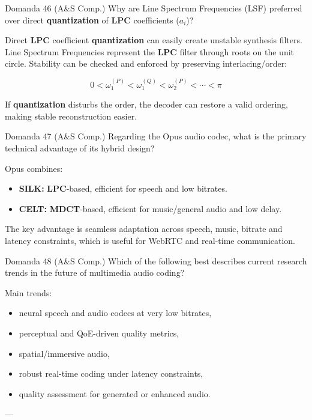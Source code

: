 \begin{questionbox}{Domanda 46}
(A\&S Comp.) Why are Line Spectrum Frequencies (LSF) preferred over direct \textbf{quantization} of \textbf{LPC} coefficients ($a_i$)?
\end{questionbox}


Direct \textbf{LPC} coefficient \textbf{quantization} can easily create unstable synthesis filters. Line Spectrum Frequencies represent the \textbf{LPC} filter through roots on the unit circle. Stability can be checked and enforced by preserving interlacing/order:


$$
0<\omega_1^{(P)}<\omega_1^{(Q)}<\omega_2^{(P)}<\cdots<\pi
$$


If \textbf{quantization} disturbs the order, the decoder can restore a valid ordering, making stable reconstruction easier.



\begin{questionbox}{Domanda 47}
(A\&S Comp.) Regarding the Opus audio codec, what is the primary technical advantage of its hybrid design?
\end{questionbox}


Opus combines:

\begin{itemize}
  \item \textbf{SILK:} \textbf{LPC}-based, efficient for speech and low bitrates.
  \item \textbf{CELT:} \textbf{MDCT}-based, efficient for music/general audio and low delay.
\end{itemize}

The key advantage is seamless adaptation across speech, music, bitrate and latency constraints, which is useful for WebRTC and real-time communication.



\begin{questionbox}{Domanda 48}
(A\&S Comp.) Which of the following best describes current research trends in the future of multimedia audio coding?
\end{questionbox}


Main trends:

\begin{itemize}
  \item neural speech and audio codecs at very low bitrates,
  \item perceptual and QoE-driven quality metrics,
  \item spatial/immersive audio,
  \item robust real-time coding under latency constraints,
  \item quality assessment for generated or enhanced audio.
\end{itemize}

---


